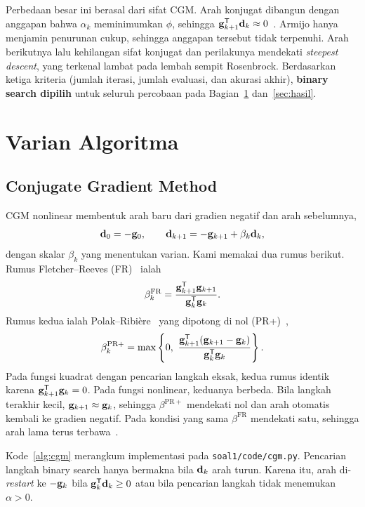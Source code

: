 \documentclass[12pt,a4paper]{article}
\begin{document}
Perbedaan besar ini berasal dari sifat CGM. Arah konjugat dibangun dengan anggapan bahwa $\alpha_k$ meminimumkan
$\phi$, sehingga $\mathbf{g}_{k+1}^{\mathsf{T}}\mathbf{d}_k\approx0$~\cite{nocedal}. Armijo hanya menjamin penurunan cukup, sehingga
anggapan tersebut tidak terpenuhi. Arah berikutnya lalu kehilangan sifat konjugat dan perilakunya mendekati
\emph{steepest descent}, yang terkenal lambat pada lembah sempit Rosenbrock. Berdasarkan ketiga kriteria (jumlah
iterasi, jumlah evaluasi, dan akurasi akhir), \textbf{binary search dipilih} untuk seluruh percobaan pada
Bagian~\ref{sec:varian} dan~\ref{sec:hasil}.

\section{Varian Algoritma}\label{sec:varian}

\subsection{Conjugate Gradient Method}\label{sec:cgm}
CGM nonlinear membentuk arah baru dari gradien negatif dan arah sebelumnya,
\begin{equation}\label{eq:cgdir}
\mathbf{d}_0=-\mathbf{g}_0,\qquad \mathbf{d}_{k+1}=-\mathbf{g}_{k+1}+\beta_k\mathbf{d}_k,
\end{equation}
dengan skalar $\beta_k$ yang menentukan varian. Kami memakai dua rumus berikut. Rumus Fletcher--Reeves
(FR)~\cite{fr} ialah
\begin{equation}\label{eq:fr}
\beta_k^{\mathrm{FR}}=\frac{\mathbf{g}_{k+1}^{\mathsf{T}}\mathbf{g}_{k+1}}{\mathbf{g}_k^{\mathsf{T}}\mathbf{g}_k}.
\end{equation}
Rumus kedua ialah Polak--Ribi\`ere~\cite{pr} yang dipotong di nol (PR+)~\cite{gilbert},
\begin{equation}\label{eq:prp}
\beta_k^{\mathrm{PR+}}=\max\left\{0,\ \frac{\bg_{k+1}^\T(\bg_{k+1}-\bg_k)}{\bg_k^\T\bg_k}\right\}.
\end{equation}
Pada fungsi kuadrat dengan pencarian langkah eksak, kedua rumus identik karena $\mathbf{g}_{k+1}^{\mathsf{T}}\mathbf{g}_k=0$. Pada fungsi
nonlinear, keduanya berbeda. Bila langkah terakhir kecil, $\mathbf{g}_{k+1}\approx\mathbf{g}_k$, sehingga $\beta^{\mathrm{PR+}}$
mendekati nol dan arah otomatis kembali ke gradien negatif. Pada kondisi yang sama $\beta^{\mathrm{FR}}$ mendekati
satu, sehingga arah lama terus terbawa~\cite{nocedal}.

Kode~\ref{alg:cgm} merangkum implementasi pada \texttt{soal1/code/cgm.py}. Pencarian langkah binary search hanya
bermakna bila $\mathbf{d}_k$ arah turun. Karena itu, arah di-\emph{restart} ke $-\mathbf{g}_k$ bila $\mathbf{g}_k^{\mathsf{T}}\mathbf{d}_k\ge0$ atau bila
pencarian langkah tidak menemukan $\alpha>0$.
\end{document}
